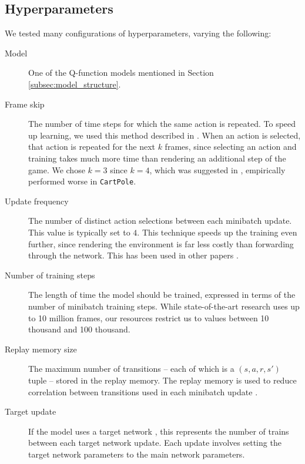 \documentclass[11pt]{article}
\newcommand{\cp}{\texttt{CartPole}}
\begin{document}
\subsection{Hyperparameters}

We tested many configurations of hyperparameters, varying the following: 

\begin{description}
    \item[Model] One of the Q-function models mentioned in Section \ref{subsec:model_structure}.
    
    \item[Frame skip] The number of time steps for which the same action is repeated. To speed up learning, we used this method described in \cite{mnih2013playing, mnih2015human}. When an action is selected, that action is repeated for the next $k$ frames, since selecting an action and training takes much more time than rendering an additional step of the game. We chose $k = 3$ since $k = 4$, which was suggested in \cite{mnih2013playing, mnih2015human}, empirically performed worse in \cp. 
    
    \item[Update frequency] The number of distinct action selections between each minibatch update. This value is typically set to $4$. This technique speeds up the training even further, since rendering the environment is far less costly than forwarding through the network. This has been used in other papers \cite{mnih2013playing, mnih2015human, van2016deep}.
    
    \item[Number of training steps] The length of time the model should be trained, expressed in terms of the number of minibatch training steps. While state-of-the-art research uses up to 10 million frames, our resources restrict us to values between 10 thousand and 100 thousand.
    
    \item[Replay memory size] The maximum number of transitions -- each of which is a $(s, a, r, s')$ tuple -- stored in the replay memory. The replay memory is used to reduce correlation between transitions used in each minibatch update \cite{mnih2013playing, mnih2015human}.
    
    \item[Target update] If the model uses a target network \cite{mnih2015human}, this represents the number of trains between each target network update. Each update involves setting the target network parameters to the main network parameters.
    

\end{description}
\end{document}
